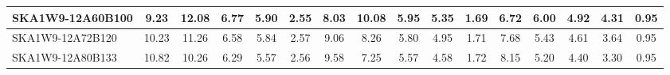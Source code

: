 \begin{table}[H]
{{\begin{tabular}{|lccccc||ccccc||ccccc|}
SKA1W9-12A60B100 & 9.23 \cellcolor{blue!28.50} & 12.08 \cellcolor{red!60.00} & 6.77 \cellcolor{green!45.62} & 5.90 \cellcolor{orange!41.82} & 2.55 \cellcolor{purple!21.82} & 8.03 \cellcolor{blue!28.70} & 10.08 \cellcolor{red!54.22} & 5.95 \cellcolor{green!50.06} & 5.35 \cellcolor{orange!52.04} & 1.69 \cellcolor{purple!18.00} & 6.72 \cellcolor{blue!31.54} & 6.00 \cellcolor{red!42.03} & 4.92 \cellcolor{green!51.09} & 4.31 \cellcolor{orange!51.14} & 0.95 \cellcolor{purple!18.00}\\ \hline 
SKA1W9-12A72B120 & 10.23 \cellcolor{blue!48.31} & 11.26 \cellcolor{red!52.91} & 6.58 \cellcolor{green!40.15} & 5.84 \cellcolor{orange!38.06} & 2.57 \cellcolor{purple!29.45} & 9.06 \cellcolor{blue!49.50} & 8.26 \cellcolor{red!37.78} & 5.80 \cellcolor{green!43.29} & 4.95 \cellcolor{orange!34.36} & 1.71 \cellcolor{purple!26.40} & 7.68 \cellcolor{blue!50.64} & 5.43 \cellcolor{red!30.89} & 4.61 \cellcolor{green!31.36} & 3.64 \cellcolor{orange!29.16} & 0.95 \cellcolor{purple!18.00}\\ \hline 
SKA1W9-12A80B133 & 10.82 \cellcolor{blue!60.00} & 10.26 \cellcolor{red!44.27} & 6.29 \cellcolor{green!31.81} & 5.57 \cellcolor{orange!21.13} & 2.56 \cellcolor{purple!25.64} & 9.58 \cellcolor{blue!60.00} & 7.25 \cellcolor{red!28.66} & 5.57 \cellcolor{green!32.90} & 4.58 \cellcolor{orange!18.00} & 1.72 \cellcolor{purple!30.60} & 8.15 \cellcolor{blue!60.00} & 5.20 \cellcolor{red!26.40} & 4.40 \cellcolor{green!18.00} & 3.30 \cellcolor{orange!18.00} & 0.95 \cellcolor{purple!18.00}\\ \hline 
\end{tabular}}
\vspace{-0.300000cm}
\hspace{1cm} 
}
\end{table}
